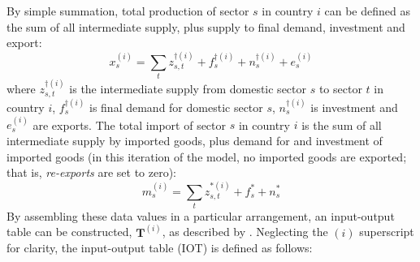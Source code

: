 \documentclass[a4paper]{article}
\begin{document}
By simple summation, total production of sector $s$ in country $i$ can be defined as the sum of all intermediate supply, plus supply to final demand, investment and export:
\begin{equation}\label{eqn:x}
x_s^{(i)}=\sum\limits_{t}z_{s,t}^{\dagger(i)} + f_s^{\dagger(i)} + n_s^{\dagger(i)} + e_s^{(i)}
\end{equation}
where $z_{s,t}^{\dagger(i)}$ is the intermediate supply from domestic sector $s$ to sector $t$ in country $i$, $f_s^{\dagger(i)}$ is final demand for domestic sector $s$, $n_s^{\dagger(i)}$ is investment and $e_s^{(i)}$ are exports.
The total import of sector $s$ in country $i$ is the sum of all intermediate supply by imported goods, plus demand for and investment of imported goods (in this iteration of the model, no imported goods are exported; that is, \textit{re-exports} are set to zero):
\begin{equation}\label{eqn:m}
m_s^{(i)}=\sum\limits_{t}z_{s,t}^{*(i)} + f_s^* + n_s^*
\end{equation}
By assembling these data values in a particular arrangement, an input-output table can be constructed, $\boldsymbol{T}^{(i)}$, as described by \textcite{Miller1985}.
Neglecting the $(i)$ superscript for clarity, the input-output table (IOT) is defined as follows:
\end{document}
